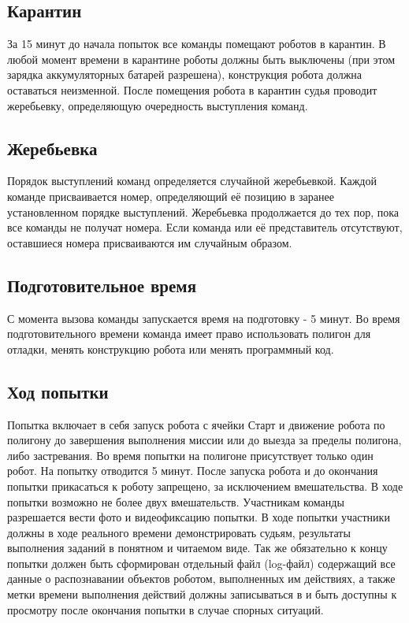 \documentclass[12pt]{article}
\begin{document}
\subsection{Карантин} \hspace*{1cm}
За 15 минут до начала попыток все команды помещают роботов в карантин. В любой момент времени в карантине роботы должны быть выключены (при этом зарядка аккумуляторных батарей разрешена), конструкция робота должна оставаться неизменной. 
После помещения робота в карантин судья проводит жеребьевку, определяющую очередность выступления команд.

\subsection{Жеребьевка} \hspace*{1cm}
Порядок выступлений команд определяется случайной жеребьевкой. Каждой команде присваивается номер, определяющий её позицию в заранее установленном порядке выступлений. Жеребьевка продолжается до тех пор, пока все команды не получат номера. Если команда или её представитель отсутствуют, оставшиеся номера присваиваются им случайным образом.

\subsection{Подготовительное время} \hspace*{1cm}
С момента вызова команды запускается время на подготовку - 5 минут. Во время подготовительного времени команда имеет право использовать полигон для отладки, менять конструкцию робота или менять программный код.

\subsection{Ход попытки} \hspace*{1cm}
Попытка включает в себя запуск робота с ячейки Старт и движение робота по полигону до завершения выполнения миссии или до выезда за пределы полигона, либо застревания. Во время попытки на полигоне присутствует только один робот. На попытку отводится 5 минут. После запуска робота и до окончания попытки прикасаться к роботу запрещено, за исключением вмешательства. В ходе попытки возможно не более двух вмешательств.  Участникам команды разрешается вести фото и видеофиксацию попытки. В ходе попытки участники должны в ходе реального времени демонстрировать судьям, результаты выполнения заданий в понятном и читаемом виде. Так же обязательно к концу попытки должен быть сформирован отдельный файл (log-файл) содержащий все данные о распознавании объектов роботом, выполненных им действиях, а также метки времени выполнения действий должны записываться в и быть доступны к просмотру после окончания попытки в случае спорных ситуаций.
\end{document}

